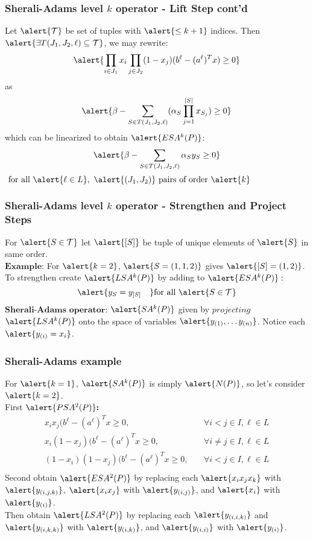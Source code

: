 \documentclass{beamer}
\begin{document}
\begin{frame}
\frametitle{Sherali-Adams level $k$ operator - Lift Step cont'd}
Let $\alert{\mathcal{T}}$ be set of tuples with $\alert{\leq k+1}$ indices. Then $\alert{\exists T(J_1,J_2,\ell) \subseteq \mathcal{T}}$, we may rewrite:
$$\alert{\prod_{i \in J_1} x_i \prod_{j \in J_2} (1 - x_j) (b^\ell - (a^\ell)^Tx) \geq 0}$$
as
$$ \alert{\beta - \sum_{S \in T(J_1, J_2,\ell)} (\alpha_S \prod_{j=1}^{|S|} x_{S_j}) \geq 0}$$
which can be linearized to obtain $\alert{ESA^k(P)}$:
$$\alert{\beta -\sum_{S \in T(J_1, J_2,\ell)} \alpha_S y_S \geq 0} $$
$\text{ for all } \alert{\ell \in L},\ \alert{(J_1, J_2)} \text{ pairs of order } \alert{k}$
\end{frame}

\begin{frame}
\frametitle{Sherali-Adams level $k$ operator - Strengthen and Project Steps}
For $\alert{S \in \mathcal{T}}$ let $\alert{[S]}$ be tuple of unique elements of $\alert{S}$ in same order.\\
$\textbf{Example:}$ For $\alert{k=2}$, $\alert{S = (1,1,2)}$ gives $\alert{[S] = (1,2)}$.\\
To strengthen create $\alert{LSA^k(P)}$ by adding to $\alert{ESA^k(P)}:$
$$\alert{y_S = y_{[S]} \quad} \text{for all } \alert{S \in \mathcal{T}}$$
$\textbf{Sherali-Adams operator:}$ $\alert{SA^k(P)}$ given by $\textit{projecting}$ $\alert{LSA^k(P)}$ onto the space of variables $\alert{y_{(1)} ,\dots y_{(n)}}$. Notice each $\alert{y_{(i)} = x_i}$.
\end{frame}

\begin{frame}
\frametitle{Sherali-Adams example}
For $\alert{k=1}$, $\alert{SA^k(P)}$ is simply $\alert{N(P)}$, so let's consider $\alert{k=2}$.\\
First $\alert{PSA^2(P)}\textbf{:}$
\alert{\begin{align*}
x_ix_j(b^\ell -(a^\ell)^Tx \geq 0,&\ &\forall i<j \in I, \ell \in L \\
x_i(1-x_j)(b^\ell -(a^\ell)^Tx \geq 0,&\ &\forall i\neq j \in I, \ell \in L \\
(1-x_i)(1-x_j)(b^\ell -(a^\ell)^Tx \geq 0,&\ &\forall i<j \in I, \ell \in L \\
\end{align*}}
Second obtain $\alert{ESA^2(P)}$ by replacing each $\alert{x_ix_jx_k}$ with $\alert{y_{(i,j,k)}}$, $\alert{x_ix_j}$ with $\alert{y_{(i,j)}}$, and $\alert{x_i}$ with $\alert{y_{(i)}}$.\\
Then obtain $\alert{LSA^2(P)}$ by replacing each $\alert{y_{(i,i,k)}}$ and $\alert{y_{(i,k,k)}}$ with $\alert{y_{(i,k)}}$, and $\alert{y_{(i,i)}}$ with $\alert{y_{(i)}}$.
\end{frame}
\end{document}
